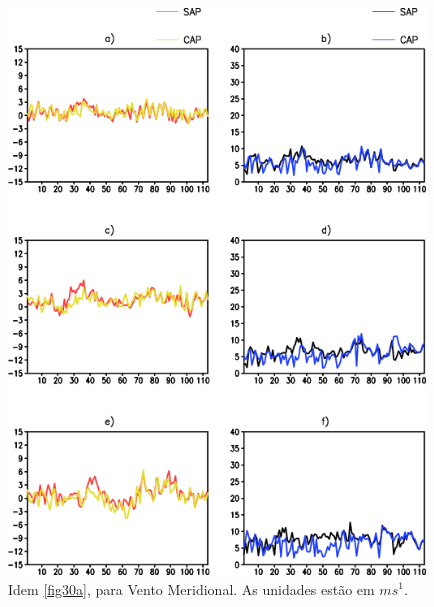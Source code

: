 \begin{figure}[!hbp]
\centering
\includegraphics[height=15cm]{./figs/vies_eqm-vvel.png}
\caption{Idem \autoref{fig30a}, para Vento Meridional. As unidades estão em $ms^{1}$.}
\label{fig33a}
\end{figure}

